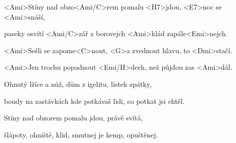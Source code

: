 

\zs
<Ami>Stíny nad obzo<Ami/C>rem pomalu <H7>jdou,
<E7>noc se <Ami>snáší,

paseky osvítí <Ami/C>zář z borovejch <Ami>klád 
zapále<Emi>nejch.
\ks

\zr
<Ami>Sešli se zapome<C>nout,
<G>a zvednout hlavu, to <Dmi>stačí.

<Ami>Jen trochu popadnout <Emi/H>dech,
než půjdou zas <Ami>dál.
\kr

\zs
Ohnutý lžíce a nůž, dům z igelitu, lístek zpátky,

boudy na zastávkách kde potkávaš lidi,
co potkat jsi chtěl.
\ks

\zr \kr

\zs
Stíny nad obzorem pomalu jdou, právě svítá,

šlápoty, ohniště, klid,
smutnej je kemp, opuštěnej.
\ks

\zr \kr

\kp





